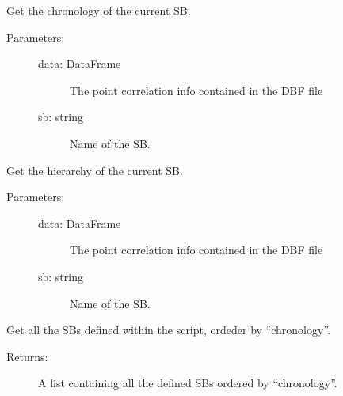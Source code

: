 \documentclass[letterpaper,10pt,english]{sphinxmanual}
\begin{document}
\begin{fulllineitems}
\label{\detokenize{hiegeo:hiegeo.get_sb_chronology}}
Get the chronology of the current SB.
\begin{description}
\item[{Parameters:}] \leavevmode\begin{description}
\item[{data: DataFrame}] \leavevmode
The point correlation info contained in the DBF file

\item[{sb: string}] \leavevmode
Name of the SB.

\end{description}

\end{description}

\end{fulllineitems}


\begin{fulllineitems}
\label{\detokenize{hiegeo:hiegeo.get_sb_hierarchy}}
Get the hierarchy of the current SB.
\begin{description}
\item[{Parameters:}] \leavevmode\begin{description}
\item[{data: DataFrame}] \leavevmode
The point correlation info contained in the DBF file

\item[{sb: string}] \leavevmode
Name of the SB.

\end{description}

\end{description}

\end{fulllineitems}


\begin{fulllineitems}
\label{\detokenize{hiegeo:hiegeo.get_sbobj}}
Get all the SBs defined within the script,
ordeder by “chronology”.
\begin{description}
\item[{Returns:}] \leavevmode
A list containing all the defined SBs ordered by “chronology”.

\end{description}

\end{fulllineitems}
\end{document}
